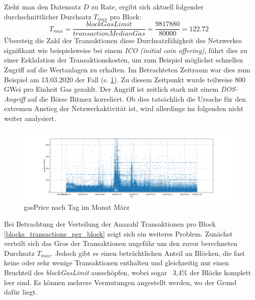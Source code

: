 \documentclass[runningheads]{llncs}
\begin{document}
Zieht man den Datensatz $ D $ zu Rate, ergibt sich aktuell folgender durchschnittlicher Durchsatz $ T_{max} $ pro Block: \cite{neemann_appendix_nodate}
$$
  T_{max} = \frac{\textit{blockGasLimit}}{\textit{transactionMedianGas}} = \frac{9817880}{80000} = 122.72
$$
Übersteig die Zahl der  Transaktionen diese Durchsatzfähigkeit des Netzwerkes signifikant wie beispielsweise bei einem \textit{ICO (initial coin offering)}, führt dies zu einer Esklalation der Transaktionskosten, um zum Beispiel möglichst schnellen Zugriff auf die Wertanlagen zu erhalten. \cite[S. 9:6 f.]{m.spain_oasics-tokeneconomics_2019} Im Betrachteten Zeitraum war dies zum Beispiel am 13.03.2020 der Fall (s. \ref{transactions_gasprice_timeseries}). Zu diesem Zeitpunkt wurde teilweise 800 GWei pro Einheit Gas gezahlt. Der Angriff ist zeitlich stark mit einem \textit{DOS-Angriff} auf die Börse Bitmex korreliert. Ob dies tatsächlich die Ursache für den extremen Anstieg der Netzwerkaktivität ist, wird allerdings im folgenden nicht weiter analysiert. \cite{bitmex_ddos_nodate}

\begin{figure}[h!]
  \centerline{\includegraphics[width=\textwidth, keepaspectratio]{transactions_gasprice_timeseries.png}}
  \caption{gasPrice nach Tag im Monat März \cite{neemann_appendix_nodate}}
  \label{transactions_gasprice_timeseries}
\end{figure}

Bei Betrachtung der Verteilung der Anazahl Transaktionen pro Block \ref{blocks_transactions_per_block} zeigt sich ein weiteres Problem. Zunächst verteilt sich das Gros der Transaktionen ungefähr um den zuvor berechneten Durchsatz $ T_{max} $. Jedoch gibt es einen beträchtlichen Anteil an Blöcken, die fast keine oder sehr wenige Transaktionen enthalten und gleichzeitig nur einen Bruchteil des \textit{blockGasLimit} ausschöpfen, wobei sogar ~3,4\% der Blöcke komplett leer sind. \cite{neemann_appendix_nodate} Es können mehrere Vermutungen angestellt werden, wo der Grund dafür liegt.
\end{document}
